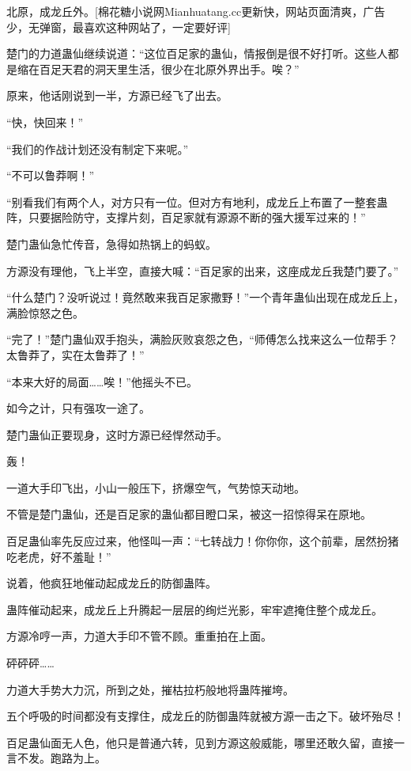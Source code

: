 
\begin{this_body}

北原，成龙丘外。[棉花糖小说网Mianhuatang.cc更新快，网站页面清爽，广告少，无弹窗，最喜欢这种网站了，一定要好评]

楚门的力道蛊仙继续说道：“这位百足家的蛊仙，情报倒是很不好打听。这些人都是缩在百足天君的洞天里生活，很少在北原外界出手。唉？”

原来，他话刚说到一半，方源已经飞了出去。

“快，快回来！”

“我们的作战计划还没有制定下来呢。”

“不可以鲁莽啊！”

“别看我们有两个人，对方只有一位。但对方有地利，成龙丘上布置了一整套蛊阵，只要据险防守，支撑片刻，百足家就有源源不断的强大援军过来的！”

楚门蛊仙急忙传音，急得如热锅上的蚂蚁。

方源没有理他，飞上半空，直接大喊：“百足家的出来，这座成龙丘我楚门要了。”

“什么楚门？没听说过！竟然敢来我百足家撒野！”一个青年蛊仙出现在成龙丘上，满脸惊怒之色。

“完了！”楚门蛊仙双手抱头，满脸灰败哀怨之色，“师傅怎么找来这么一位帮手？太鲁莽了，实在太鲁莽了！”

“本来大好的局面……唉！”他摇头不已。

如今之计，只有强攻一途了。

楚门蛊仙正要现身，这时方源已经悍然动手。

轰！

一道大手印飞出，小山一般压下，挤爆空气，气势惊天动地。

不管是楚门蛊仙，还是百足家的蛊仙都目瞪口呆，被这一招惊得呆在原地。

百足蛊仙率先反应过来，他怪叫一声：“七转战力！你你你，这个前辈，居然扮猪吃老虎，好不羞耻！”

说着，他疯狂地催动起成龙丘的防御蛊阵。

蛊阵催动起来，成龙丘上升腾起一层层的绚烂光影，牢牢遮掩住整个成龙丘。

方源冷哼一声，力道大手印不管不顾。重重拍在上面。

砰砰砰……

力道大手势大力沉，所到之处，摧枯拉朽般地将蛊阵摧垮。

五个呼吸的时间都没有支撑住，成龙丘的防御蛊阵就被方源一击之下。破坏殆尽！

百足蛊仙面无人色，他只是普通六转，见到方源这般威能，哪里还敢久留，直接一言不发。跑路为上。


\end{this_body}
